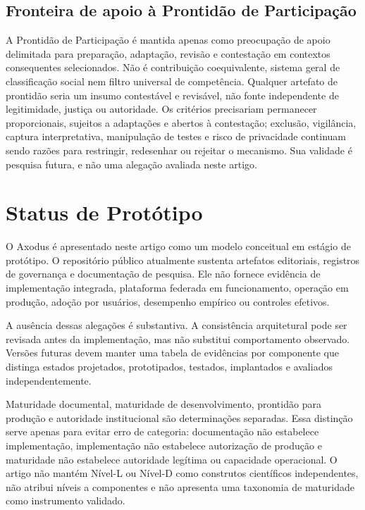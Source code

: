 \documentclass[11pt]{article}
\begin{document}
\subsection{Fronteira de apoio à Prontidão de Participação}

A Prontidão de Participação é mantida apenas como preocupação de apoio
delimitada para preparação, adaptação, revisão e contestação em contextos
consequentes selecionados. Não é contribuição coequivalente, sistema geral de
classificação social nem filtro universal de competência. Qualquer artefato de
prontidão seria um insumo contestável e revisável, não fonte independente de
legitimidade, justiça ou autoridade. Os critérios precisariam permanecer
proporcionais, sujeitos a adaptações e abertos à contestação; exclusão,
vigilância, captura interpretativa, manipulação de testes e risco de
privacidade continuam sendo razões para restringir, redesenhar ou rejeitar o
mecanismo. Sua validade é pesquisa futura, e não uma alegação avaliada neste
artigo.

\section{Status de Protótipo}

O Axodus é apresentado neste artigo como um modelo conceitual em estágio de
protótipo. O repositório público atualmente sustenta artefatos editoriais,
registros de governança e documentação de pesquisa. Ele não fornece evidência
de implementação integrada, plataforma federada em funcionamento, operação em
produção, adoção por usuários, desempenho empírico ou controles efetivos.

A ausência dessas alegações é substantiva. A consistência arquitetural pode
ser revisada antes da implementação, mas não substitui comportamento observado.
Versões futuras devem manter uma tabela de evidências por componente que
distinga estados projetados, prototipados, testados, implantados e avaliados
independentemente.

Maturidade documental, maturidade de desenvolvimento, prontidão para produção
e autoridade institucional são determinações separadas. Essa distinção serve
apenas para evitar erro de categoria: documentação não estabelece
implementação, implementação não estabelece autorização de produção e
maturidade não estabelece autoridade legítima ou capacidade operacional. O
artigo não mantém Nível-L ou Nível-D como construtos científicos independentes,
não atribui níveis a componentes e não apresenta uma taxonomia de maturidade
como instrumento validado.
\end{document}
